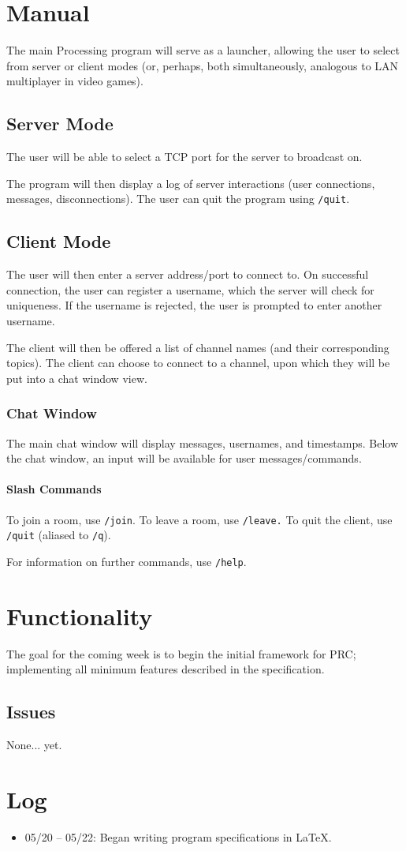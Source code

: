 \documentclass{article}
\begin{document}
\newpage

\section{Manual}
The main Processing program will serve as a launcher, allowing the user to select from server or client modes (or, perhaps, both simultaneously, analogous to LAN multiplayer in video games).

\subsection{Server Mode}
The user will be able to select a TCP port for the server to broadcast on.

The program will then display a log of server interactions (user connections, messages, disconnections). The user can quit the program using \verb|/quit|.

\subsection{Client Mode}
The user will then enter a server address/port to connect to. On successful connection, the user can register a username, which the server will check for uniqueness. If the username is rejected, the user is prompted to enter another username.

The client will then be offered a list of channel names (and their corresponding topics). The client can choose to connect to a channel, upon which they will be put into a chat window view.


\subsubsection{Chat Window}
The main chat window will display messages, usernames, and timestamps. Below the chat window, an input will be available for user messages/commands.

\paragraph{Slash Commands}
To join a room, use \verb|/join|. To leave a room, use \verb|/leave.| To quit the client, use \verb|/quit| (aliased to \verb|/q|).

For information on further commands, use \verb|/help|.

\section{Functionality}
The goal for the coming week is to begin the initial framework for PRC; implementing all minimum features described in the specification.

\subsection{Issues}
None... yet.

\section{Log}
\begin{itemize}
    \item 05/20 -- 05/22: Began writing program specifications in \LaTeX.
\end{itemize}
\end{document}
